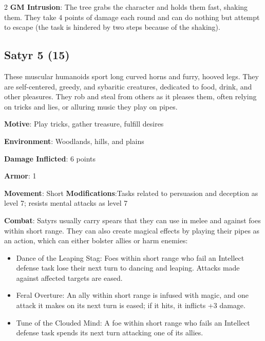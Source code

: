 \begin{multicols}{2}
\textbf{GM Intrusion}: The tree grabs the character and holds them fast, shaking them. They take 4 points of damage each round and can do nothing but attempt to escape (the task is hindered by two steps because of the shaking).

\subsection{Satyr 5 (15)}

These muscular humanoids sport long curved horns and furry, hooved legs. They are self-centered, greedy, and sybaritic creatures, dedicated to food, drink, and other pleasures. They rob and steal from others as it pleases them, often relying on tricks and lies, or alluring music they play on pipes. 

\textbf{Motive}: Play tricks, gather treasure, fulfill desires 

\textbf{Environment}: Woodlands, hills, and plains 

\textbf{Damage Inflicted}: 6 points 

\textbf{Armor}: 1 

\textbf{Movement}: Short \textbf{Modifications}:Tasks related to persuasion and deception as level 7; resists mental attacks as level 7 

\textbf{Combat}: Satyrs usually carry spears that they can use in melee and against foes within short range. They can also create magical effects by playing their pipes as an action, which can either bolster allies or harm enemies: 

\begin{itemize}
\item Dance of the Leaping Stag: Foes within short range who fail an Intellect defense task lose their next turn to dancing and leaping. Attacks made against affected targets are eased. 

\item Feral Overture: An ally within short range is infused with magic, and one attack it makes on its next turn is eased; if it hits, it inflicts +3 damage. 

\item Tune of the Clouded Mind: A foe within short range who fails an Intellect defense task spends its next turn attacking one of its allies. 
\end{itemize}


\end{multicols}
